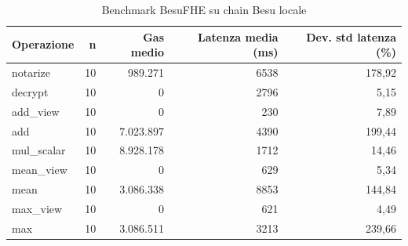 \begin{table}[H]
\centering
\caption{Benchmark BesuFHE su chain Besu locale}
\label{tab:besufhe-local-benchmark}
\begin{tabular}{lrrrr}
\hline
\textbf{Operazione} & \textbf{n} & \textbf{Gas medio} & \textbf{Latenza media (ms)} & \textbf{Dev. std latenza (\%)} \\
\hline
notarize & 10 & 989.271 & 6538 & 178,92 \\
decrypt & 10 & 0 & 2796 & 5,15 \\
add\_view & 10 & 0 & 230 & 7,89 \\
add & 10 & 7.023.897 & 4390 & 199,44 \\
mul\_scalar & 10 & 8.928.178 & 1712 & 14,46 \\
mean\_view & 10 & 0 & 629 & 5,34 \\
mean & 10 & 3.086.338 & 8853 & 144,84 \\
max\_view & 10 & 0 & 621 & 4,49 \\
max & 10 & 3.086.511 & 3213 & 239,66 \\
\hline
\end{tabular}
\end{table}
\vspace{4pt}

